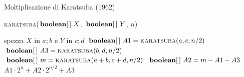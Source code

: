 \begin{frame}[shrink=5]{Moltiplicazione di Karatsuba (1962)}

\vspace{-12pt}

\begin{Procedure}
\caption[A]{\BOOLEAN[\,] \textsc{karatsuba}($\BOOLEAN[\,]\ X$, $\BOOLEAN[\,]\ Y$, \INTEGER $n$)}
{
  spezza $X$ in $a;b$ e $Y$ in $c;d$\;
  $\BOOLEAN[\,]\ A1 = \textsc{karatsuba}(a,c, n/2)$\;
  $\BOOLEAN[\,]\ A3 = \textsc{karatsuba}(b,d, n/2)$\;
  $\BOOLEAN[\,]\ m  = \textsc{karatsuba}(a+b,c+d, n/2)$\;
  $\BOOLEAN[\,]\ A2 = m-A1-A3$\;
  \Return $A1\cdot 2^n + A2 \cdot 2^{n/2} + A3$\;
}
\end{Procedure}

\end{frame}


